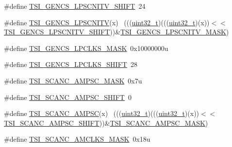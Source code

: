 \begin{DoxyCompactItemize}
\item 
\#define \hyperlink{group___t_s_i___register___masks_ga925b30be99db125b6524ede3ef7af689}{T\+S\+I\+\_\+\+G\+E\+N\+C\+S\+\_\+\+L\+P\+S\+C\+N\+I\+T\+V\+\_\+\+S\+H\+I\+FT}~24
\item 
\#define \hyperlink{group___t_s_i___register___masks_gade959d31be4b537f59b115fbd4ca988a}{T\+S\+I\+\_\+\+G\+E\+N\+C\+S\+\_\+\+L\+P\+S\+C\+N\+I\+TV}(x)                                    ~(((\hyperlink{_p_e___types_8h_a33594304e786b158f3fb30289278f5af}{uint32\+\_\+t})(((\hyperlink{_p_e___types_8h_a33594304e786b158f3fb30289278f5af}{uint32\+\_\+t})(x))$<$$<$\hyperlink{group___t_s_i___register___masks_ga925b30be99db125b6524ede3ef7af689}{T\+S\+I\+\_\+\+G\+E\+N\+C\+S\+\_\+\+L\+P\+S\+C\+N\+I\+T\+V\+\_\+\+S\+H\+I\+FT}))\&\hyperlink{group___t_s_i___register___masks_gaf89fb1d534403dbb1be0df6093c0d529}{T\+S\+I\+\_\+\+G\+E\+N\+C\+S\+\_\+\+L\+P\+S\+C\+N\+I\+T\+V\+\_\+\+M\+A\+SK})
\item 
\#define \hyperlink{group___t_s_i___register___masks_ga10761aaf1cd7148018bd3ae41583e66c}{T\+S\+I\+\_\+\+G\+E\+N\+C\+S\+\_\+\+L\+P\+C\+L\+K\+S\+\_\+\+M\+A\+SK}~0x10000000u
\item 
\#define \hyperlink{group___t_s_i___register___masks_ga620a7a5a90382cea065b1498ff7a41ed}{T\+S\+I\+\_\+\+G\+E\+N\+C\+S\+\_\+\+L\+P\+C\+L\+K\+S\+\_\+\+S\+H\+I\+FT}~28
\item 
\#define \hyperlink{group___t_s_i___register___masks_ga005284b8b7706c54a56d4c88f5974dc9}{T\+S\+I\+\_\+\+S\+C\+A\+N\+C\+\_\+\+A\+M\+P\+S\+C\+\_\+\+M\+A\+SK}~0x7u
\item 
\#define \hyperlink{group___t_s_i___register___masks_ga2dae9d2c84538073c5ef08d391150c97}{T\+S\+I\+\_\+\+S\+C\+A\+N\+C\+\_\+\+A\+M\+P\+S\+C\+\_\+\+S\+H\+I\+FT}~0
\item 
\#define \hyperlink{group___t_s_i___register___masks_ga4b0c2e21de678ed097431bb897d4f73f}{T\+S\+I\+\_\+\+S\+C\+A\+N\+C\+\_\+\+A\+M\+P\+SC}(x)                                          ~(((\hyperlink{_p_e___types_8h_a33594304e786b158f3fb30289278f5af}{uint32\+\_\+t})(((\hyperlink{_p_e___types_8h_a33594304e786b158f3fb30289278f5af}{uint32\+\_\+t})(x))$<$$<$\hyperlink{group___t_s_i___register___masks_ga2dae9d2c84538073c5ef08d391150c97}{T\+S\+I\+\_\+\+S\+C\+A\+N\+C\+\_\+\+A\+M\+P\+S\+C\+\_\+\+S\+H\+I\+FT}))\&\hyperlink{group___t_s_i___register___masks_ga005284b8b7706c54a56d4c88f5974dc9}{T\+S\+I\+\_\+\+S\+C\+A\+N\+C\+\_\+\+A\+M\+P\+S\+C\+\_\+\+M\+A\+SK})
\item 
\#define \hyperlink{group___t_s_i___register___masks_ga020a126e5eafeff150a1b960bc17679f}{T\+S\+I\+\_\+\+S\+C\+A\+N\+C\+\_\+\+A\+M\+C\+L\+K\+S\+\_\+\+M\+A\+SK}~0x18u

\end{DoxyCompactItemize}
